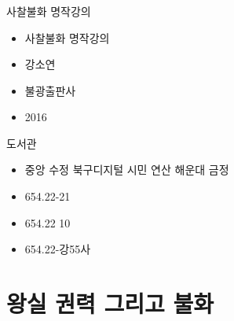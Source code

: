 \documentclass[aspectratio=1610,17pt,xcolor=pdftex,dvipsnames,table,handout]{beamer}
\begin{document}
		\begin{frame} [t,plain]
		\frametitle{}

			\begin{block} { 사찰불화 명작강의 }
			\setlength{\leftmargini}{4em}			
			\begin{itemize}
				\item [제목]  	사찰불화 명작강의 
				\item [지은이]	강소연 
				\item [출판사]	불광출판사 
				\item [출판일]	2016 
			\end{itemize}
			\end{block}						
								
			\begin{block} {도서관}
			\setlength{\leftmargini}{4em}			
			\begin{itemize}
				\item [도서관]	중앙 수정 북구디지털 시민 연산 해운대 금정 	
				\item [중앙]		654.22-21
				\item [수정]		654.22 10
				\item [금정] 	654.22-강55사 

			\end{itemize}
			\end{block}						

		\end{frame}						



		\section{ 왕실 권력 그리고 불화 }
\end{document}
